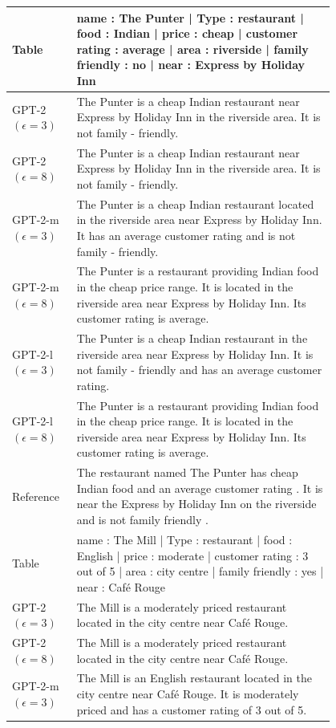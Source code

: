 \begin{table}[h]
\centering
\renewcommand{\arraystretch}{0.7}
\scriptsize
\begin{tabular}{l | p{0.8\linewidth}}
\toprule
Table & name : The Punter | Type : restaurant | food : Indian | price : cheap | customer rating : average | area : riverside | family friendly : no | near : Express by Holiday Inn  \\
 \hline
GPT-2 $(\epsilon=3)$ & The Punter is a cheap Indian restaurant near Express by Holiday Inn in the riverside area. It is not family - friendly. \\
GPT-2 $(\epsilon=8)$ & The Punter is a cheap Indian restaurant near Express by Holiday Inn in the riverside area. It is not family - friendly. \\
GPT-2-m $(\epsilon=3)$ & The Punter is a cheap Indian restaurant located in the riverside area near Express by Holiday Inn. It has an average customer rating and is not family - friendly. \\
GPT-2-m $(\epsilon=8)$ & The Punter is a restaurant providing Indian food in the cheap price range. It is located in the riverside area near Express by Holiday Inn. Its customer rating is average. \\
GPT-2-l $(\epsilon=3)$ & The Punter is a cheap Indian restaurant in the riverside area near Express by Holiday Inn. It is not family - friendly and has an average customer rating. \\
GPT-2-l $(\epsilon=8)$ & The Punter is a restaurant providing Indian food in the cheap price range. It is located in the riverside area near Express by Holiday Inn. Its customer rating is average. \\
\hline
 Reference & The restaurant named The Punter has cheap Indian food and an average customer rating . It is near the Express by Holiday Inn on the riverside and is not family friendly . \\
\midrule\midrule
Table & name : The Mill | Type : restaurant | food : English | price : moderate | customer rating : 3 out of 5 | area : city centre | family friendly : yes | near : Café Rouge  \\
 \hline
GPT-2 $(\epsilon=3)$ & The Mill is a moderately priced restaurant located in the city centre near Café Rouge. \\
GPT-2 $(\epsilon=8)$ & The Mill is a moderately priced restaurant located in the city centre near Café Rouge. \\
GPT-2-m $(\epsilon=3)$ & The Mill is an English restaurant located in the city centre near Café Rouge. It is moderately priced and has a customer rating of 3 out of 5. \\

\end{tabular}
\end{table}
